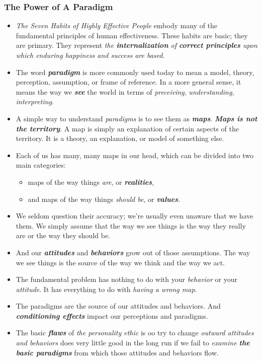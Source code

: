 \documentclass[11pt]{article}
\begin{document}
\subsubsection{The Power of A Paradigm}
\begin{itemize}
\item \emph{The Seven Habits of Highly Effective People} embody many of the fundamental principles of human effectiveness. These habits are basic; they are primary. They represent \emph{the \textbf{internalization} of \textbf{correct principles} upon which enduring happiness and success are based}.

\item The word \emph{\textbf{paradigm}} is more commonly used today to mean a model, theory, perception, assumption, or frame of reference. In a more general sense, it means the way we \emph{\textbf{see}} the world in terms of \emph{preceiving}, \emph{understanding}, \emph{interpreting}.

\item A simple way to understand \emph{paradigms} is to see them as \emph{\textbf{maps}}. \emph{\textbf{Maps is not the territory}}. A map is simply an explanation of certain aspects of the territory. It is a theory, an explanation, or model of something else.

\item Each of us has many, many maps in our head, which can be divided into two main categories: 
\begin{itemize}
\item maps of the way things \emph{are}, or \emph{\textbf{realities}}, 
\item and maps of the way things \emph{should be}, or \emph{\textbf{values}}.
\end{itemize} 

\item We seldom question their accuracy; we're usually even unaware that we have them. We simply assume that the way we see things is the way
they really are or the way they should be. 

\item And our \emph{\textbf{attitudes}} and \emph{\textbf{behaviors}} grow out of those assumptions. The way we see things is the source of the way we think and the way we act.


\item The fundamental problem has nothing to do with your \emph{behavior} or your \emph{attitude}. It has everything to do with \emph{having a wrong map}.

\item The paradigms are the source of our attitudes and behaviors. And \emph{\textbf{conditioning effects}} impact our perceptions and paradigms. 

\item The basic \emph{\textbf{flaws}} of \emph{the personality ethic} is oo try to change \emph{outward attitudes and behaviors} does very little good in the long run if we fail to \emph{examine \textbf{the basic paradigms}} from which those attitudes and behaviors flow.
\end{itemize}
\end{document}
